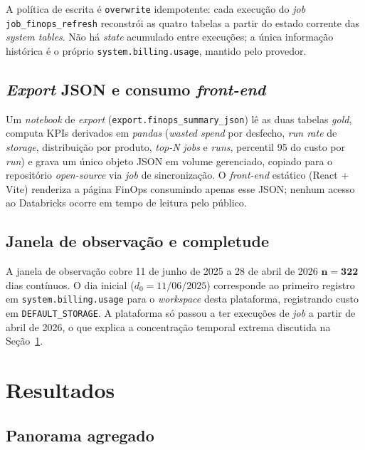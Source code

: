 \documentclass[12pt,a4paper,oneside]{article}
\begin{document}
A política de escrita é \texttt{overwrite} idempotente: cada
execução do \textit{job} \texttt{job\_finops\_refresh} reconstrói
as quatro tabelas a partir do estado corrente das \textit{system
tables}. Não há \textit{state} acumulado entre execuções; a única
informação histórica é o próprio \texttt{system.billing.usage},
mantido pelo provedor.

\subsection{\textit{Export} JSON e consumo \textit{front-end}}

Um \textit{notebook} de \textit{export}
(\texttt{export.finops\_summary\_json}) lê as duas tabelas
\textit{gold}, computa KPIs derivados em \textit{pandas}
(\textit{wasted spend} por desfecho, \textit{run rate} de
\textit{storage}, distribuição por produto, \textit{top-N} \textit{jobs}
e \textit{runs}, percentil 95 do custo por \textit{run}) e grava um
único objeto JSON em volume gerenciado, copiado para o repositório
\textit{open-source} via \textit{job} de sincronização. O
\textit{front-end} estático (React + Vite) renderiza a página
FinOps consumindo apenas esse JSON; nenhum acesso ao Databricks
ocorre em tempo de leitura pelo público.

\subsection{Janela de observação e completude}

A janela de observação cobre 11 de junho de 2025 a 28 de abril de
2026 \textemdash{} \(\mathbf{n = 322}\) dias contínuos. O dia
inicial (\(d_0 = 11/06/2025\)) corresponde ao primeiro registro
em \texttt{system.billing.usage} para o \textit{workspace} desta
plataforma, registrando custo em \texttt{DEFAULT\_STORAGE}. A
plataforma só passou a ter execuções de \textit{job} a partir de
abril de 2026, o que explica a concentração temporal extrema
discutida na Seção~\ref{sec:results}.

\section{Resultados}\label{sec:results}

\subsection{Panorama agregado}
\end{document}
